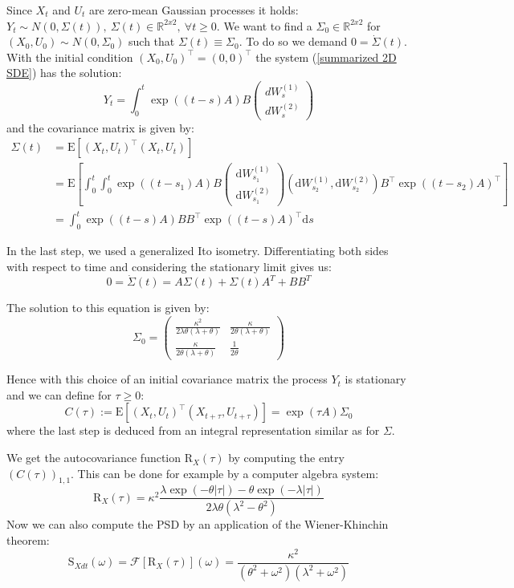 \documentclass[%
thesis=student,%
coverpage=false,%
titlepage=false,%
headmarks=true, %
english,%
font=libertine, %
math=newpxtx, %
BCOR=5mm,%
coverBCOR=11mm%
]{tumbook}
\begin{document}
Since $X_{t}$ and $U_{t}$ are zero-mean Gaussian processes it holds: $Y_{t} \sim N(0,\Sigma(t)),\ \Sigma(t) \in \mathbb{R}^{2x2}, \ \forall t\geq 0$. We want to find a $\Sigma_{0} \in \mathbb{R}^{2x2}$ for $(X_{0},U_{0}) \sim N(0,\Sigma_{0})$ such that $\Sigma(t) \equiv \Sigma_{0}$. To do so we demand $0 = \dot{\Sigma}(t)$. With the initial condition $(X_{0},U_{0})^\top = (0,0)^\top$ the system (\ref{summarized 2D SDE}) has the solution: 
\[
Y_{t} = \int_{0}^{t}\exp((t-s)A)B\begin{pmatrix} dW_{s}^{(1)} \\ dW_{s}^{(2)} \end{pmatrix}
\]
and the covariance matrix is given by:
\begin{align*}
\Sigma(t)&=\mathrm{E}[\left(X_t,U_t\right)^\top\left(X_t,U_t\right)]\\
 &=\mathrm{E}[\int_0^t\int_0^t\exp((t-s_1)A)B\begin{pmatrix}\mathrm{d} W_{s_1}^{(1)}\\\mathrm{d} W_{s_1}^{(2)}\end{pmatrix}\left(\mathrm{d} W_{s_2}^{(1)},\mathrm{d} W_{s_2}^{(2)}\right)B^\top\exp((t-s_2)A)^\top]\\
 &=\int_0^t\exp((t-s)A)BB^\top\exp((t-s)A)^\top \mathrm{d} s
\end{align*}

In the last step, we used a generalized Ito isometry. Differentiating both sides with respect to time and considering the stationary limit gives us:
\[
0 = \dot{\Sigma}(t) = A\Sigma(t) + \Sigma(t) A^{T} + BB^{T} 
\]

The solution to this equation is given by: 
\[
\Sigma_{0} = 
\begin{pmatrix}
    \frac{\kappa^{2}}{2\lambda\theta(\lambda + \theta)} & \frac{\kappa}{2\theta(\lambda + \theta)} \\
    \frac{\kappa}{2\theta(\lambda + \theta)} & \frac{1}{2\theta}
\end{pmatrix}
\]

Hence with this choice of an initial covariance matrix the process $Y_{t}$ is stationary and we can define for $\tau \geq 0$:
\[
C(\tau):=\mathrm{E}[(X_{t},U_{t})^\top(X_{t+\tau},U_{t+\tau})] = \exp(\tau A)\Sigma_{0}
\]
where the last step is deduced from an integral representation similar as for $\Sigma$.

We get the autocovariance function $\mathrm{R}_{X}(\tau)$ by computing the entry $(C(\tau))_{1,1}$. This can be done for example by a computer algebra system: 
\[
\mathrm{R}_{X}(\tau) = \kappa^{2}\frac{\lambda\exp(-\theta\lvert\tau\rvert)-\theta\exp(-\lambda\lvert\tau\rvert)}{2\lambda\theta(\lambda^{2}-\theta^{2})} 
\]
Now we can also compute the PSD by an application of the Wiener-Khinchin theorem:
\[
\mathrm{S}_{Xdt}(\omega) = \mathcal{F}[\mathrm{R}_{X}(\tau)](\omega) = \frac{\kappa^{2}}{(\theta^{2} + \omega^{2})(\lambda^{2} + \omega^{2})}
\]
\end{document}
